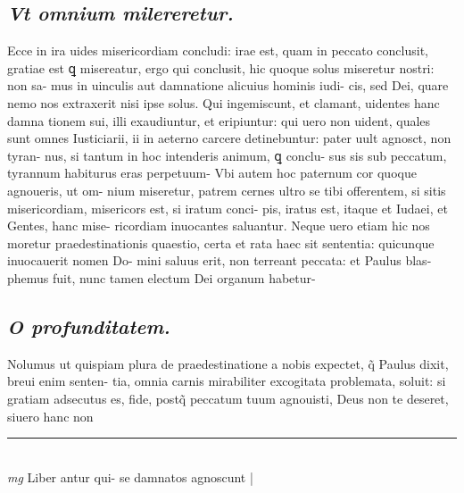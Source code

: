 \documentclass{article}
\begin{document}
\begin{pages}
\subsection*{\textit{Vt omnium milereretur. }}\pstart Ecce in ira uides misericordiam concludi: irae est, quam in peccato conclusit, gratiae est ꝗ misereatur, ergo qui conclusit, hic quoque solus miseretur nostri: non sa- mus in uinculis aut damnatione alicuius hominis iudi- cis, sed Dei, quare nemo nos extraxerit nisi ipse solus.  Qui ingemiscunt, et clamant, uidentes hanc damna tionem sui, illi exaudiuntur, et eripiuntur: qui uero non uident, quales sunt omnes Iusticiarii, ii in aeterno carcere detinebuntur: pater uult agnosct, non tyran- nus, si tantum in hoc intenderis animum, ꝗ conclu- sus sis sub peccatum, tyrannum habiturus eras perpetuum- Vbi autem hoc paternum cor quoque agnoueris, ut om- nium miseretur, patrem cernes ultro se tibi offerentem, si sitis misericordiam, misericors est, si iratum conci- pis, iratus est, itaque et Iudaei, et Gentes, hanc mise- ricordiam inuocantes saluantur. Neque uero etiam hic nos moretur praedestinationis quaestio, certa et rata haec sit sententia: quicunque inuocauerit nomen Do- mini saluus erit, non terreant peccata: et Paulus blas- phemus fuit, nunc tamen electum Dei organum habetur-  \pend
{}
{}
\subsection*{\textit{O profunditatem. }}\pstart Nolumus ut quispiam plura de praedestinatione a nobis expectet, q̃ Paulus dixit, breui enim senten- tia, omnia carnis mirabiliter excogitata problemata, soluit: si gratiam adsecutus es, fide, postq̃ peccatum tuum agnouisti, Deus non te deseret, siuero hanc non  \pend
\vspace{0.5cm}\noindent
\vspace{0.2cm}\rule{1cm}{0.2pt}\\ 
\hspace{0.2cm}\textit{mg}
\footnotesize Liber antur qui- se damnatos agnoscunt 
\normalsize| 

\end{pages}
\end{document}
